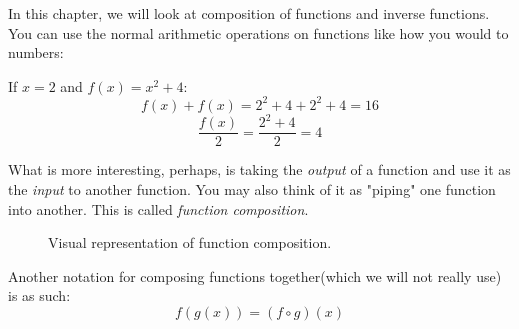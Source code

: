 \quad \quad In this chapter, we will look at composition of functions and inverse functions. You can use the normal arithmetic operations on functions like how you would to numbers:

\begin{example}
  If \(x=2\) and \(f(x)=x^2+4\):
  \begin{equation*}
    f(x)+f(x) = 2^2+4+2^2+4=16 
  \end{equation*}
  \begin{equation*}
    \frac{f(x)}{2} = \frac{2^2+4}{2} = 4 
  \end{equation*}
\end{example}

What is more interesting, perhaps, is taking the \textit{output} of a function and use it as the \textit{input} to another function. You may also think of it as "piping" one function into another. This is called \textit{function composition}.


  \begin{figure}[h]
  \centering
  \caption{Visual representation of function composition.}

\end{figure} 

Another notation for composing functions together(which we will not really use) is as such:
\begin{equation*}
  f(g(x))=(f \circ g)(x) 
\end{equation*}


